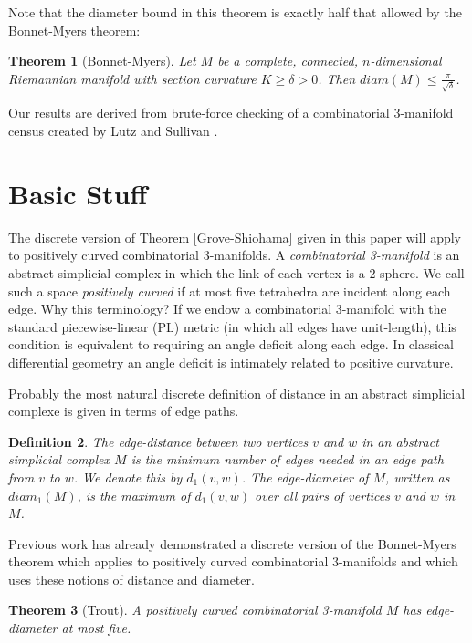 \documentclass[12pt]{article}
\newtheorem{thm}{Theorem}[section]
\newtheorem{dfn}[thm]{Definition}
\begin{document}
\noindent Note that the diameter bound in this theorem is exactly half that allowed by the Bonnet-Myers theorem:

\begin{thm}[Bonnet-Myers] Let $M$ be a complete, connected, $n$-dimensional Riemannian manifold with section curvature $K \geq \delta > 0$. Then $diam(M) \leq \frac{\pi}{\sqrt{\delta}}$.
\end{thm}

\noindent Our results are derived from brute-force checking of a combinatorial 3-manifold census created by Lutz and Sullivan \cite{LS}.

\section{Basic Stuff}
\label{sect:basics}

The discrete version of Theorem \ref{Grove-Shiohama} given in this paper will apply to positively curved combinatorial 3-manifolds. A {\em combinatorial 3-manifold} is an abstract simplicial complex in which the link of each vertex is a 2-sphere. We call such a space {\em positively curved} if at most five tetrahedra are incident along each edge. Why this terminology? If we endow a combinatorial 3-manifold with the standard piecewise-linear (PL) metric (in which all edges have unit-length), this condition is equivalent to requiring an angle deficit along each edge. In classical differential geometry an angle deficit is intimately related to positive curvature.

Probably the most natural discrete definition of distance in an abstract simplicial complexe is given in terms of edge paths.

\begin{dfn}The {\em edge-distance} between two vertices $v$ and $w$ in an abstract simplicial complex $M$ is the minimum number of edges needed in an edge path from $v$ to $w$. We denote this by $d_1(v,w)$. The {\em edge-diameter} of $M$, written as $diam_1(M)$, is the maximum of $d_1(v,w)$ over all pairs of vertices $v$ and $w$ in $M$. 
\end{dfn}

\noindent Previous work \cite{Trout10} has already demonstrated a discrete version of the Bonnet-Myers theorem which applies to positively curved combinatorial 3-manifolds and which uses these notions of distance and diameter.

\begin{thm}[Trout] A positively curved combinatorial 3-manifold $M$ has edge-diameter at most five.
\label{discrete_BM}
\end{thm}
\end{document}
